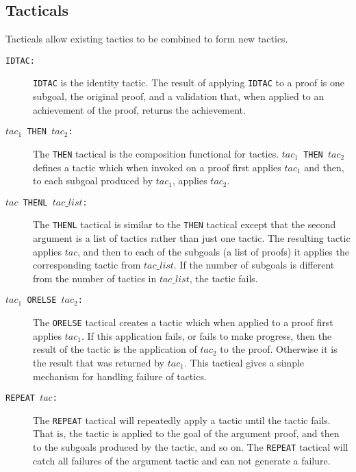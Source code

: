 \subsection*{Tacticals}

Tacticals allow existing tactics
to be combined to form new tactics.


\begin{description}

\item[{\tt IDTAC:}]
{\tt IDTAC}
is the identity tactic.  The result of
applying {\tt IDTAC} to a
proof is one subgoal, the original proof, and a validation that, when
applied to an achievement of the proof, returns the achievement.  

\item [{\tt $tac_1$ THEN $tac_2$:}]
The {\tt THEN}
tactical is the composition functional for tactics.
{\tt $tac_1$ THEN $tac_2$} defines a tactic
which when invoked on a proof first applies $tac_1$ and then, to each
subgoal produced by $tac_1$, applies $tac_2$.

\item [{\tt $tac$ THENL $tac\_list$:}] The {\tt THENL}
tactical is similar to the
{\tt THEN} tactical except that the second argument is a list of tactics
rather than just one tactic.  The resulting tactic applies $tac$, and
then to each of the subgoals (a list of proofs) it applies the corresponding
tactic from $tac\_list$.  If the number of subgoals is different from
the number of tactics in $tac\_list$, the tactic fails.


\item [{\tt $tac_1$ ORELSE $tac_2$:}]  The
{\tt ORELSE} tactical creates a tactic
which when applied to a proof first applies $tac_1$.  If this application
fails, or fails to make progress,
then the result of the tactic is the application of $tac_2$ to the
proof.  Otherwise it is the result that was returned by $tac_1$.  This
tactical gives a simple mechanism for handling failure of tactics.

\item [{\tt REPEAT $tac$:}]   The {\tt REPEAT}
tactical  will repeatedly apply
a tactic until the tactic fails.  That is, the tactic is applied to the goal
of the argument proof, and then to the subgoals produced by the tactic, and
so on.  The {\tt REPEAT} tactical will catch all failures of the argument
tactic and can not generate a failure.



\end{description}
